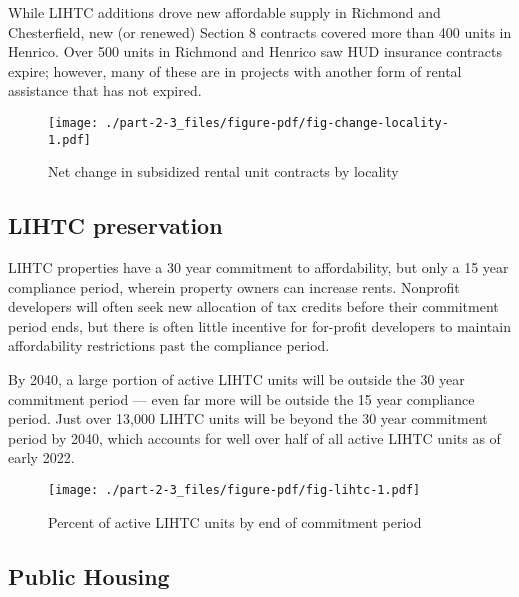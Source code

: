 \documentclass[
  letterpaper,
  DIV=11,
  numbers=noendperiod]{scrreprt}
\begin{document}
While LIHTC additions drove new affordable supply in Richmond and
Chesterfield, new (or renewed) Section 8 contracts covered more than 400
units in Henrico. Over 500 units in Richmond and Henrico saw HUD
insurance contracts expire; however, many of these are in projects with
another form of rental assistance that has not expired.

\begin{figure}

{\centering \texttt{[image: ./part-2-3\_files/figure-pdf/fig-change-locality-1.pdf]}

}

\caption{\label{fig-change-locality}Net change in subsidized rental unit
contracts by locality}

\end{figure}

\hypertarget{lihtc-preservation}{%
\subsection{LIHTC preservation}\label{lihtc-preservation}}

LIHTC properties have a 30 year commitment to affordability, but only a
15 year compliance period, wherein property owners can increase rents.
Nonprofit developers will often seek new allocation of tax credits
before their commitment period ends, but there is often little incentive
for for-profit developers to maintain affordability restrictions past
the compliance period.

By 2040, a large portion of active LIHTC units will be outside the 30
year commitment period --- even far more will be outside the 15 year
compliance period. Just over 13,000 LIHTC units will be beyond the 30
year commitment period by 2040, which accounts for well over half of all
active LIHTC units as of early 2022.

\begin{figure}

{\centering \texttt{[image: ./part-2-3\_files/figure-pdf/fig-lihtc-1.pdf]}

}

\caption{\label{fig-lihtc}Percent of active LIHTC units by end of
commitment period}

\end{figure}

\hypertarget{public-housing}{%
\subsection{Public Housing}\label{public-housing}}
\end{document}
